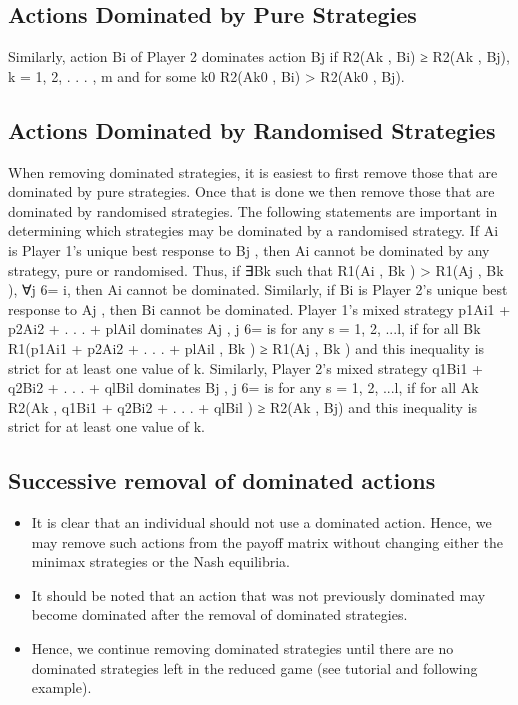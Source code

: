 \documentclass[]{report}
\begin{document}
\subsection{Actions Dominated by Pure Strategies}
Similarly, action Bi of Player 2 dominates action Bj
if
R2(Ak , Bi) ≥ R2(Ak , Bj), k = 1, 2, . . . , m
and for some k0
R2(Ak0
, Bi) > R2(Ak0
, Bj).
\subsection{Actions Dominated by Randomised Strategies}
When removing dominated strategies, it is easiest to first remove
those that are dominated by pure strategies.
Once that is done we then remove those that are dominated by
randomised strategies.
The following statements are important in determining which
strategies may be dominated by a randomised strategy.
If Ai
is Player 1’s unique best response to Bj
, then Ai cannot be
dominated by any strategy, pure or randomised.
Thus, if ∃Bk such that R1(Ai
, Bk ) > R1(Aj
, Bk ), ∀j 6= i, then Ai
cannot be dominated.
Similarly, if Bi
is Player 2’s unique best response to Aj
, then Bi
cannot be dominated.
Player 1’s mixed strategy p1Ai1 + p2Ai2 + . . . + plAil
dominates Aj
,
j 6= is for any s = 1, 2, ...l, if for all Bk
R1(p1Ai1 + p2Ai2 + . . . + plAil
, Bk ) ≥ R1(Aj
, Bk )
and this inequality is strict for at least one value of k.
Similarly, Player 2’s mixed strategy q1Bi1 + q2Bi2 + . . . + qlBil
dominates Bj
, j 6= is for any s = 1, 2, ...l, if for all Ak
R2(Ak , q1Bi1 + q2Bi2 + . . . + qlBil
) ≥ R2(Ak , Bj)
and this inequality is strict for at least one value of k.
\subsection{Successive removal of dominated actions}
\begin{itemize}
	\item It is clear that an individual should not use a dominated action.
	Hence, we may remove such actions from the payoff matrix without
	changing either the minimax strategies or the Nash equilibria.
\item	It should be noted that an action that was not previously
	dominated may become dominated after the removal of dominated
	strategies.
\item Hence, we continue removing dominated strategies until there are
	no dominated strategies left in the reduced game (see tutorial and
	following example).
\end{itemize}
\end{document}
